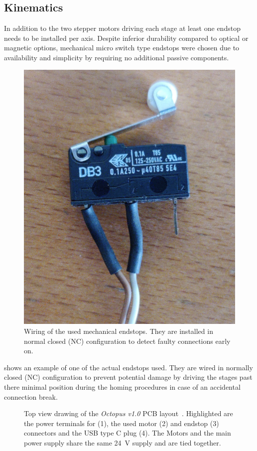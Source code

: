         \subsection{Kinematics}\label{sec:kinematics}
            In addition to the two stepper motors driving each stage at least one endstop needs to be installed per axis.
            Despite inferior durability compared to optical or magnetic options, mechanical micro switch type endstops were chosen due to availability and simplicity by requiring no additional passive components.
            \begin{figure}[h]
                \centering
                \includegraphics[width=.25\textwidth]{pictures/footage/endstop_switch.jpg}
                \caption[Wiring of the used mechanical endstops]{Wiring of the used mechanical endstops. They are installed in normal closed (NC) configuration to detect faulty connections early on.}%
                \label{fig:endstop pic}
            \end{figure}

             shows an example of one of the actual endstops used.
            They are wired in normally closed (NC) configuration to prevent potential damage by driving the stages past there minimal position during the homing procedures in case of an accidental connection break.

            \begin{figure}[h]
                \centering
                
                \caption[Top view drawing of the \textit{Octopus v1.0} PCB layout]{Top view drawing of the \textit{Octopus v1.0} PCB layout~\cite{Manual.BigTreeTechOctopus}. Highlighted are the power terminals for (1), the used motor (2) and endstop (3) connectors and the USB type C plug (4). The Motors and the main power supply share the same \qty{24}{\volt} supply and are tied together.}%
                \label{fig:octopus connections}
            \end{figure}

